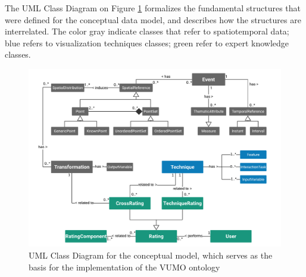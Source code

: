 \documentclass[]{interact}
\theoremstyle{plain}%
\theoremstyle{definition}
\theoremstyle{remark}
\theoremstyle{definition}
\begin{document}
%

The UML Class Diagram on Figure \ref{fig:uml} formalizes the fundamental structures that were defined for the conceptual data model, and describes how the structures are interrelated. The color gray indicate classes that refer to spatiotemporal data; blue refers to visualization techniques classes; green refer to expert knowledge classes.

\begin{figure}[hbt]
	\centering
	\includegraphics[width=1\textwidth]{images/uml2018}
	\caption[UML Class Diagram for the conceptual model]{UML Class Diagram for the conceptual model, which serves as the basis for the implementation of the VUMO ontology}
	\label{fig:uml}
\end{figure}
\end{document}
